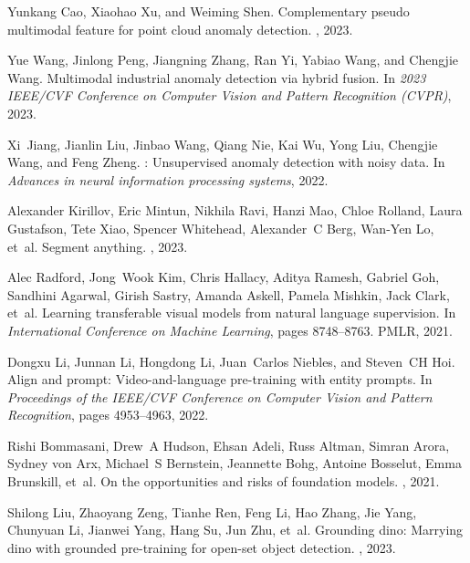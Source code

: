 {\begin{thebibliography}{10}
Yunkang Cao, Xiaohao Xu, and Weiming Shen.
\newblock Complementary pseudo multimodal feature for point cloud anomaly
  detection.
, 2023.

Yue Wang, Jinlong Peng, Jiangning Zhang, Ran Yi, Yabiao Wang, and Chengjie
  Wang.
\newblock Multimodal industrial anomaly detection via hybrid fusion.
\newblock In {\em 2023 {IEEE}/{CVF} Conference on Computer Vision and Pattern
  Recognition ({CVPR})}, 2023.

Xi~Jiang, Jianlin Liu, Jinbao Wang, Qiang Nie, Kai Wu, Yong Liu, Chengjie Wang,
  and Feng Zheng.
: Unsupervised anomaly detection with noisy data.
\newblock In {\em Advances in neural information processing systems}, 2022.

Alexander Kirillov, Eric Mintun, Nikhila Ravi, Hanzi Mao, Chloe Rolland, Laura
  Gustafson, Tete Xiao, Spencer Whitehead, Alexander~C Berg, Wan-Yen Lo, et~al.
\newblock Segment anything.
, 2023.

Alec Radford, Jong~Wook Kim, Chris Hallacy, Aditya Ramesh, Gabriel Goh,
  Sandhini Agarwal, Girish Sastry, Amanda Askell, Pamela Mishkin, Jack Clark,
  et~al.
\newblock Learning transferable visual models from natural language
  supervision.
\newblock In {\em International Conference on Machine Learning}, pages
  8748--8763. PMLR, 2021.

Dongxu Li, Junnan Li, Hongdong Li, Juan~Carlos Niebles, and Steven~CH Hoi.
\newblock Align and prompt: Video-and-language pre-training with entity
  prompts.
\newblock In {\em Proceedings of the IEEE/CVF Conference on Computer Vision and
  Pattern Recognition}, pages 4953--4963, 2022.

Rishi Bommasani, Drew~A Hudson, Ehsan Adeli, Russ Altman, Simran Arora, Sydney
  von Arx, Michael~S Bernstein, Jeannette Bohg, Antoine Bosselut, Emma
  Brunskill, et~al.
\newblock On the opportunities and risks of foundation models.
, 2021.

Shilong Liu, Zhaoyang Zeng, Tianhe Ren, Feng Li, Hao Zhang, Jie Yang, Chunyuan
  Li, Jianwei Yang, Hang Su, Jun Zhu, et~al.
\newblock Grounding dino: Marrying dino with grounded pre-training for open-set
  object detection.
, 2023.


\end{thebibliography}}
